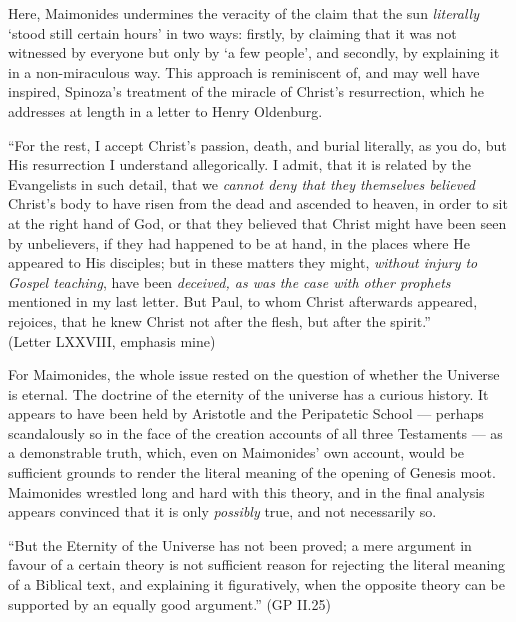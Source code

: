 \documentclass[12pt]{article}
\begin{document}
Here, Maimonides undermines the veracity of the claim that the sun \emph{literally} `stood still certain hours' in two ways: firstly, by claiming that it was not witnessed by everyone but only by `a few people', and secondly, by explaining it in a non-miraculous way. This approach is reminiscent of, and may well have inspired, Spinoza's treatment of the miracle of Christ's resurrection, which he addresses at length in a letter to Henry Oldenburg.

\begin{displayquote}
``For the rest, I accept Christ's passion, death, and burial literally, as you do, but His resurrection I understand allegorically. I admit, that it is related by the Evangelists in such detail, that we \emph{cannot deny that they themselves believed} Christ's body to have risen from the dead and ascended to heaven, in order to sit at the right hand of God, or that they believed that Christ might have been seen by unbelievers, if they had happened to be at hand, in the places where He appeared to His disciples; but in these matters they might, \emph{without injury to Gospel teaching}, have been \emph{deceived, as was the case with other prophets} mentioned in my last letter. But Paul, to whom Christ afterwards appeared, rejoices, that he knew Christ not after the flesh, but after the spirit.'' \\ \phantom{a} \hfill (Letter LXXVIII, emphasis mine)
\end{displayquote}

For Maimonides, the whole issue rested on the question of whether the Universe is eternal. The doctrine of the eternity of the universe has a curious history. It appears to have been held by Aristotle and the Peripatetic School  --- perhaps scandalously so in the face of the creation accounts of all three Testaments --- as a demonstrable truth, which, even on Maimonides' own account, would be sufficient grounds to render the literal meaning of the opening of Genesis moot. Maimonides wrestled long and hard with this theory, and in the final analysis appears convinced that it is only \emph{possibly} true, and not necessarily so. %
\begin{displayquote}
``But the Eternity of the Universe has not been proved; a mere argument in favour of a certain theory is not sufficient reason for rejecting the literal meaning of a Biblical text, and explaining it figuratively, when the opposite theory can be supported by an equally good argument.'' \hfill (GP II.25)
\end{displayquote}
\end{document}

